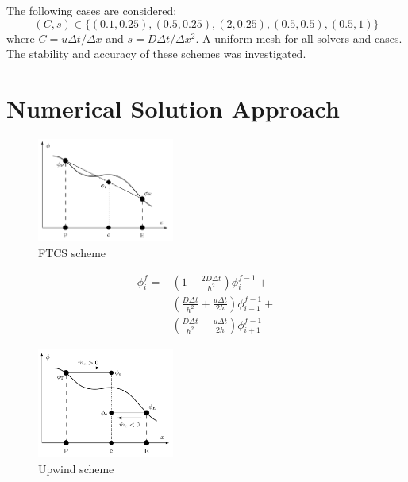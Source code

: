 \documentclass[twocolumn,10pt]{asme2ej}
\begin{document}
The following cases are considered:
\begin{equation*}
(C, s) \in \{(0.1, 0.25), (0.5, 0.25), (2, 0.25), (0.5, 0.5), (0.5, 1)\}
\end{equation*}
\noindent where $C = u\Delta t/\Delta x$ and $s = D\Delta t/\Delta x^2$. A uniform mesh for all solvers and cases. The stability and accuracy of these schemes was investigated.

\section{Numerical Solution Approach}

\begin{figure}[thb]
\begin{center}
\includegraphics[width=0.4\textwidth]{figure/FTCS.png}
\caption{FTCS scheme}
\label{FTCS_scheme}
\end{center}
\end{figure}

\begin{equation}
\label{ftcs_eqn}
\begin{split}
\phi_i ^f = & \left(1-\frac{2 D\Delta t}{h^2}\right) \phi_i ^{f-1} + \\
            & \left(\frac{D \Delta t}{h^2} + \frac{u \Delta t}{2h}\right) \phi_{i-1} ^{f-1} + \\
            & \left(\frac{D \Delta t}{h^2} - \frac{u \Delta t}{2h}\right) \phi_{i+1} ^{f-1}
\end{split}
\end{equation}

\begin{figure}[thb]
\begin{center}
\includegraphics[width=0.4\textwidth]{figure/Upwind.png}
\caption{Upwind scheme}
\label{Upwind_scheme}
\end{center}
\end{figure}
\end{document}
